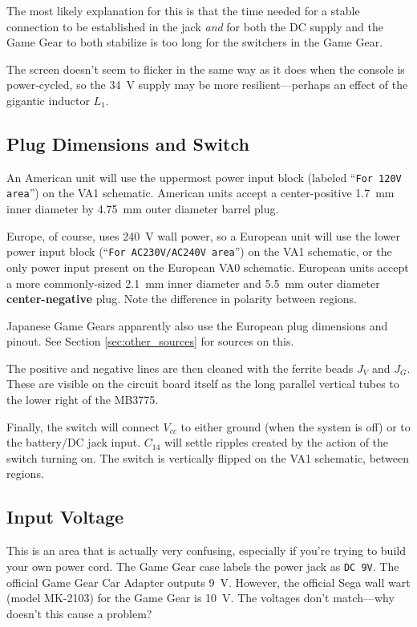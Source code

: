 \documentclass{article}
\newcommand{\Vcc}{$V_{cc}$}
\newcommand{\model}{\textsf}
\begin{document}
The most likely explanation for this is that the time needed for a
stable connection to be established in the jack \textit{and} for both
the DC supply and the Game Gear to both stabilize is too long for the
switchers in the Game Gear.

The screen doesn't seem to flicker in the same way as it does when the
console is power-cycled, so the \qty{34}{\volt} supply may be more
resilient---perhaps an effect of the gigantic inductor $L_1$.

\subsection{Plug Dimensions and Switch}
\label{sec:plug_dimensions}
An American unit will use the uppermost power input block (labeled
``\texttt{For 120V area}'') on the \model{VA1} schematic. American
units accept a center-positive \qty{1.7}{\milli\meter} inner diameter
by \qty{4.75}{\milli\meter} outer diameter barrel plug.

Europe, of course, uses \qty{240}{\volt} wall power, so a European
unit will use the lower power input block (``\texttt{For AC230V/AC240V
  area}'') on the \model{VA1} schematic, or the only power input
present on the European \model{VA0} schematic. European units accept a
more commonly-sized \qty{2.1}{\milli\meter} inner diameter and
\qty{5.5}{\milli\meter} outer diameter \textbf{center-negative}
plug. Note the difference in polarity between regions.

Japanese Game Gears apparently also use the European plug dimensions
and pinout. See Section \ref{sec:other_sources} for sources on this.

The positive and negative lines are then cleaned with the ferrite
beads $J_V$ and $J_G$. These are visible on the circuit board itself
as the long parallel vertical tubes to the lower right of the
\model{MB3775}.

Finally, the switch will connect \Vcc{} to either ground (when the
system is off) or to the battery/DC jack input. $C_{14}$ will settle
ripples created by the action of the switch turning on. The switch is
vertically flipped on the \model{VA1} schematic, between regions.

\subsection{Input Voltage}
This is an area that is actually very confusing, especially if you're
trying to build your own power cord. The Game Gear case labels the
power jack as \texttt{DC 9V}. The official Game Gear Car Adapter
outputs \qty{9}{\volt}. However, the official Sega wall wart (model
\model{MK-2103}) for the Game Gear is \qty{10}{\volt}. The voltages
don't match---why doesn't this cause a problem?
\end{document}

